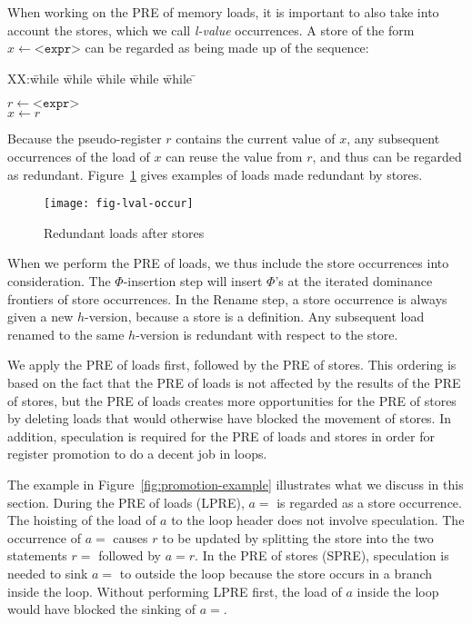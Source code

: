 When working on the PRE of memory loads, it is important to also take into
account the stores, which we call \emph{l-value} occurrences.  A store of the 
form $x \leftarrow \texttt{<expr>}$ can be regarded as being made up of the
sequence:
\begin{tabbing}
XX:\= while \= while \= while \= while \= while \= \kill

\> \> $r \leftarrow \texttt{<expr>}$ \\
\> \> $x \leftarrow r$ \\
\end{tabbing}
Because the pseudo-register $r$ contains the current value of $x$, any
subsequent occurrences of the load of $x$ can reuse the value from $r$, and
thus can be regarded as redundant.   Figure~\ref{fig:lval-occur} gives examples
of loads made redundant by stores.

\begin{figure}
\centering
\texttt{[image: fig-lval-occur]}
\caption{Redundant loads after stores}
\label{fig:lval-occur}
\end{figure}

When we perform the PRE of loads, we thus include the store occurrences into
consideration.  The $\Phi$-insertion step will insert $\Phi$'s at the iterated
dominance frontiers of store occurrences.  In the Rename step, a store
occurrence is always given a new $h$-version, because a store is a definition.
Any subsequent load renamed to the same $h$-version is redundant with respect
to the store.

We apply the PRE of loads
first, followed by the PRE of stores.  This ordering is based on the fact that
the PRE of loads is not affected by the results of the PRE of stores, but the
PRE of loads creates more opportunities for the PRE of stores by deleting
loads that would otherwise have blocked the movement of stores.  In addition,
speculation is required for the PRE of loads and stores in order for register
promotion to do a decent job in loops.  

The example in Figure~\ref{fig:promotion-example} illustrates what we discuss
in this section.  During the PRE of loads (LPRE), $a =$ is regarded as a
store occurrence.  The hoisting of the load of $a$ to the loop header does
not involve speculation. The occurrence of $a =$ causes $r$ to be updated
by splitting the store into the two statements $r =$ followed by $a = r$.  In 
the PRE of stores (SPRE), speculation is needed to sink $a =$ to outside the
loop because the store occurs in a branch inside the loop.  Without performing 
LPRE first, the load of $a$ inside the loop would
have blocked the sinking of $a =$.

